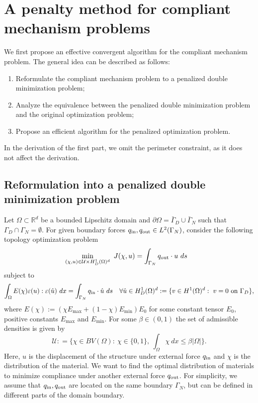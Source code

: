 \documentclass{amsart}
\begin{document}
 \section{A penalty method for compliant mechanism problems}\label{sec:problem}
We first propose an effective convergent algorithm for the compliant mechanism problem. The general idea can be described as follows: 
\begin{enumerate}
    \item Reformulate the compliant mechanism problem to a penalized double minimization problem;
    
    \item Analyze the equivalence between the penalized double minimization problem and the original optimization problem;
    
    \item Propose an efficient algorithm for the penalized optimization problem.
\end{enumerate}
In the derivation of the first part, we omit the perimeter constraint, as it does not affect the derivation.

\subsection{Reformulation into a penalized double minimization problem}
Let $\Omega\subset\mathbb{R}^d$ be a bounded Lipschitz domain and $\partial\Omega=\bar{\Gamma}_D\cup \bar{\Gamma}_N$ such that $\Gamma_D\cap \Gamma_N=\emptyset$. 
For given boundary forces $q_{\rm in},q_{\rm out}\in L^2(\Gamma_N)$, consider the following topology optimization problem
\begin{align}\label{opt_obj}
    &\min_{(\chi,u)\in \mathcal{U}\times H_D^1(\Omega)^d}\ J(\chi,u) = \int_{\Gamma_N}q_{\rm out}\cdot u\ ds
\end{align}
subject to
\begin{equation}\label{elasticity_state}                                
\int_{\Omega}E(\chi)\varepsilon(u):\varepsilon(\hat{u})\ dx=\int_{\Gamma_N}q_{\rm in}\cdot \hat{u}\ ds\quad \forall \hat{u}\in H_D^1(\Omega)^d:=\{v\in H^1(\Omega)^d:\ v=0\ \mbox{on}\ \Gamma_D\},
\end{equation}
where $E(\chi):=(\chi E_{\max} +(1-\chi)E_{\min})E_0$ for some constant tensor $E_0$, positive constants $E_{\max}$ and $E_{\min}$. For some $\beta\in (0,1)$ the set of admissible densities is given by  
\begin{equation}
 \mathcal{U}: =\Big\{\chi\in BV(\Omega):\ \chi\in \{0,1\},\ \int_{\Omega}\chi\ dx \leq\beta|\Omega|\Big\}.\nonumber   
\end{equation}
Here, $u$ is the displacement of the structure under external force $q_{\rm in}$ and $\chi$ is the distribution of the material. We want to find the optimal distribution of materials to minimize compliance under another external force $q_{\rm out}$. For simplicity, we assume that $q_{\rm in},q_{\rm out}$ are located on the same boundary $\Gamma_N$, but can  be defined in different parts of the domain boundary.
\end{document}
